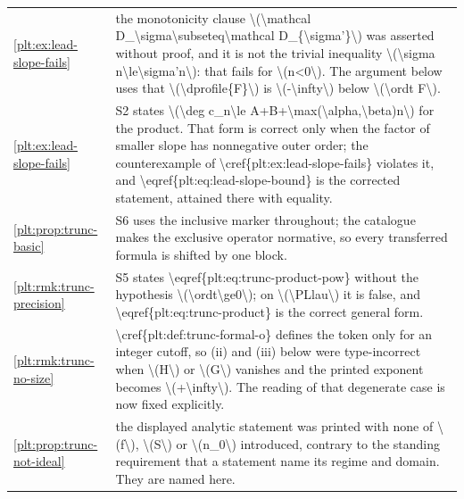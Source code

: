 \documentclass[11pt,oneside]{article}
\theoremstyle{plain}
\theoremstyle{definition}
\theoremstyle{remark}
\begin{document}
\begin{longtable}{@{}p{} p{}@{}}
\cref{plt:ex:lead-slope-fails} & the monotonicity clause \textbackslash (\textbackslash mathcal D\_\textbackslash sigma\textbackslash subseteq\textbackslash mathcal D\_\{\textbackslash sigma'\}\textbackslash ) was asserted without proof, and it is not the trivial inequality \textbackslash (\textbackslash sigma n\textbackslash le\textbackslash sigma'n\textbackslash ): that fails for \textbackslash (n<0\textbackslash ). The argument below uses that \textbackslash (\textbackslash dprofile\{F\}\textbackslash ) is \textbackslash (-\textbackslash infty\textbackslash ) below \textbackslash (\textbackslash ordt F\textbackslash ).\\
\cref{plt:ex:lead-slope-fails} & S2 states \textbackslash (\textbackslash deg c\_n\textbackslash le A+B+\textbackslash max(\textbackslash alpha,\textbackslash beta)n\textbackslash ) for the product. That form is correct only when the factor of smaller slope has nonnegative outer order; the counterexample of \textbackslash cref\{plt:ex:lead-slope-fails\} violates it, and \textbackslash eqref\{plt:eq:lead-slope-bound\} is the corrected statement, attained there with equality.\\
\cref{plt:prop:trunc-basic} & S6 uses the inclusive marker throughout; the catalogue makes the exclusive operator normative, so every transferred formula is shifted by one block.\\
\cref{plt:rmk:trunc-precision} & S5 states \textbackslash eqref\{plt:eq:trunc-product-pow\} without the hypothesis \textbackslash (\textbackslash ordt\textbackslash ge0\textbackslash ); on \textbackslash (\textbackslash PLlau\textbackslash ) it is false, and \textbackslash eqref\{plt:eq:trunc-product\} is the correct general form.\\
\cref{plt:rmk:trunc-no-size} & \textbackslash cref\{plt:def:trunc-formal-o\} defines the token only for an integer cutoff, so (ii) and (iii) below were type-incorrect when \textbackslash (H\textbackslash ) or \textbackslash (G\textbackslash ) vanishes and the printed exponent becomes \textbackslash (+\textbackslash infty\textbackslash ). The reading of that degenerate case is now fixed explicitly.\\
\cref{plt:prop:trunc-not-ideal} & the displayed analytic statement was printed with none of \textbackslash (f\textbackslash ), \textbackslash (S\textbackslash ) or \textbackslash (n\_0\textbackslash ) introduced, contrary to the standing requirement that a statement name its regime and domain. They are named here.\\

\end{longtable}
\end{document}
